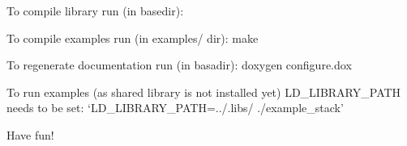 To compile library run (in basedir)\+: 
\begin{DoxyCode}{0}
\end{DoxyCode}


To compile examples run (in examples/ dir)\+: {\ttfamily make}

To regenerate documentation run (in basadir)\+: {\ttfamily doxygen configure.\+dox}

To run examples (as shared library is not installed yet) L\+D\+\_\+\+L\+I\+B\+R\+A\+R\+Y\+\_\+\+P\+A\+TH needs to be set\+: `L\+D\+\_\+\+L\+I\+B\+R\+A\+R\+Y\+\_\+\+P\+A\+TH=../.libs/ ./example\+\_\+stack'

Have fun! 